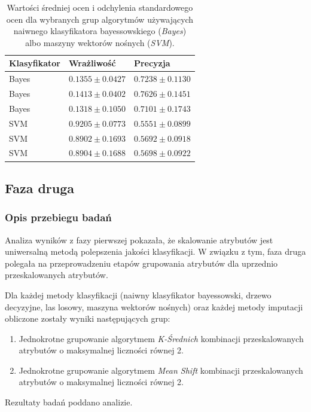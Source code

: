\documentclass[../thesis.tex]{subfiles}
\begin{document}
\begin{table}[h]
\begin{center}
\begin{tabular}{ | l | l | l | }
\hline
\rowcolor{lightgray} Klasyfikator & Wrażliwość & Precyzja \\\hline

Bayes & $0.1355 \pm 0.0427$ & $0.7238 \pm 0.1130$\\\hline
Bayes & $0.1413 \pm 0.0402$ & $0.7626 \pm 0.1451$\\\hline
Bayes & $0.1318 \pm 0.1050$ & $0.7101 \pm 0.1743$\\\hline
SVM & $0.9205 \pm 0.0773$ & $0.5551 \pm 0.0899$\\\hline
SVM & $0.8902 \pm 0.1693$ & $0.5692 \pm 0.0918$\\\hline
SVM & $0.8904 \pm 0.1688$ & $0.5698 \pm 0.0922$\\\hline

\end{tabular}
\caption{Wartości średniej ocen i odchylenia standardowego ocen dla wybranych grup algorytmów używających naiwnego klasyfikatora bayessowskiego (\emph{Bayes}) albo maszyny wektorów nośnych (\emph{SVM}).}
\label{results:table_svm_bayes}
\end{center}
\end{table}

\subsection{Faza druga}

\subsubsection{Opis przebiegu badań}

Analiza wyników z fazy pierwszej pokazała, że skalowanie atrybutów jest uniwersalną metodą polepszenia jakości klasyfikacji. W związku z tym, faza druga polegała na przeprowadzeniu etapów grupowania atrybutów dla uprzednio przeskalowanych atrybutów.

Dla każdej metody klasyfikacji (naiwny klasyfikator bayessowski, drzewo decyzyjne, las losowy, maszyna wektorów nośnych) oraz każdej metody imputacji obliczone zostały wyniki następujących grup:
\begin{enumerate}
  \item Jednokrotne grupowanie algorytmem \emph{K-Średnich} kombinacji przeskalowanych atrybutów o maksymalnej liczności równej 2.
  \item Jednokrotne grupowanie algorytmem \emph{Mean Shift} kombinacji przeskalowanych atrybutów o maksymalnej liczności równej 2.
\end{enumerate}
Rezultaty badań poddano analizie.
\end{document}
